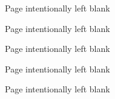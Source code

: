 \documentclass[12pts,twoside,a4paper]{report}
\title{\thesistitle}
\author{\authorname}
\date{\today}
\begin{document}
 

	
 	\clearpage
 		Page intentionally left blank
 		
%  	
	
 	\clearpage
 		Page intentionally left blank

% 	
	
	\clearpage
		Page intentionally left blank
		
	
	\clearpage
		Page intentionally left blank
 		

	\tableofcontents
	\listoffigures
	\listoftables

	
	\clearpage
		Page intentionally left blank

	
    
    
 	

	\singlespacing
	
	
\end{document}
